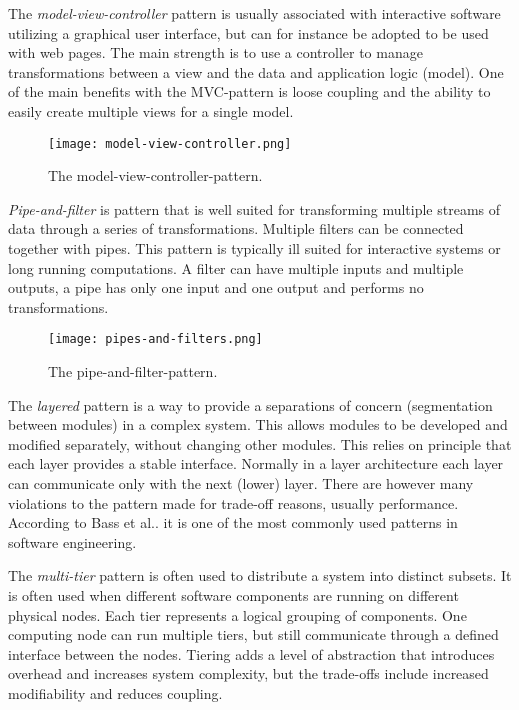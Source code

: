 The \textit{model-view-controller} pattern is usually associated with
interactive software utilizing a graphical user interface, but can for 
instance be adopted to be used with web pages. The main strength is to use a
controller to manage transformations between a view and the data and 
application logic (model). One of the main benefits with the MVC-pattern is
loose coupling and the ability to easily create multiple views for a single
model. \cite[pp. 213-215]{bass2012software}
\begin{figure}[!htbp] %
	\texttt{[image: model-view-controller.png]}
	\caption{The model-view-controller-pattern. \cite[p. 214]{bass2012software}}
	\label{fig:mvc-pattern}
\end{figure}

\textit{Pipe-and-filter} is pattern that is well suited for transforming
multiple streams of data through a series of transformations. Multiple filters
can be connected together with pipes. This pattern is typically ill suited for
interactive systems or long running computations. A filter can have
multiple inputs and multiple outputs, a pipe has only one input and one output
and performs no transformations. \cite[215-217]{bass2012software}
\begin{figure}[!htbp] %
	\texttt{[image: pipes-and-filters.png]}
	\caption{The pipe-and-filter-pattern. \cite[p. 217]{bass2012software}}
	\label{fig:pipeandfilter-pattern}
\end{figure}

The \textit{layered} pattern is a way to provide a separations of concern
(segmentation between modules) in a complex system. This allows modules to be
developed and modified separately, without changing other modules. This relies
on principle that each layer provides a stable interface. Normally in a layer
architecture each layer can communicate only with the next (lower) layer. There
are however many violations to the pattern made for trade-off reasons, usually
performance. According to Bass et al.. it is one of the most commonly used 
patterns in software engineering. \cite[pp. 205-210]{bass2012software}

The \textit{multi-tier} pattern is often used to distribute a system into
distinct subsets. It is often used when different software components are
running on different physical nodes. Each tier represents a logical grouping of
components. One computing node can run multiple tiers, but still communicate
through a defined interface between the nodes. Tiering adds a level of
abstraction that introduces overhead and increases system complexity, but the
trade-offs include increased modifiability and reduces coupling.
 \cite[pp. 235-238]{bass2012software}

